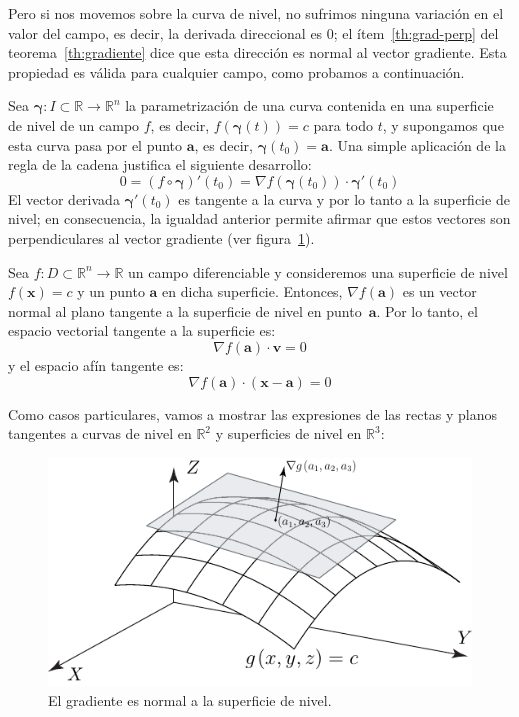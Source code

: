 Pero si nos movemos sobre la curva de nivel, no sufrimos ninguna variación en el valor del campo, es decir, la derivada direccional es 0;
el ítem~\ref{th:grad-perp} del teorema~\ref{th:gradiente}
dice que esta dirección es normal al vector gradiente.
Esta propiedad es válida para cualquier campo, como probamos a continuación.

Sea $\boldsymbol\gamma\colon I\subset\mathbb{R}\to\mathbb{R}^n$ la parametrización de una curva contenida en una superficie de nivel de un campo $f$, es decir, $f(\boldsymbol\gamma(t))=c$ para todo $t$, y supongamos que esta curva pasa por el punto $\boldsymbol a$, es decir, $\boldsymbol\gamma(t_0)=\boldsymbol a$.
Una simple aplicación de la regla de la cadena justifica el siguiente desarrollo:
\[
0=(f\circ \boldsymbol\gamma)'(t_0)=
\nabla f(\boldsymbol\gamma(t_0))\cdot\boldsymbol\gamma'(t_0)
\]
El vector derivada $\boldsymbol\gamma'(t_0)$ es tangente a la curva y por lo tanto a la superficie de nivel; en consecuencia, la igualdad anterior permite afirmar que estos vectores son perpendiculares al vector gradiente (ver figura~\ref{fig:sup-niv}).
%
\begin{teorema}\label{teo:tang-nivel}
Sea $f\colon \mathit{D}\subset\mathbb{R}^n\to \mathbb{R}$ un campo diferenciable y consideremos una superficie de nivel $f(\boldsymbol x)=c$ y un punto $\boldsymbol a$ en dicha superficie.
Entonces, $\nabla f(\boldsymbol a)$ es un vector normal al plano tangente a la superficie de nivel en punto~$\boldsymbol a$.
Por lo tanto, el espacio vectorial tangente a la superficie es:
\[
\nabla f(\boldsymbol a)\cdot\boldsymbol v =0
\]
y el espacio afín tangente es:
\[
\nabla f(\boldsymbol a)\cdot(\boldsymbol x -\boldsymbol a)=0
\]
\end{teorema}
%
Como casos particulares, vamos a mostrar las expresiones de las rectas y planos tangentes a curvas de nivel en $\mathbb{R}^2$ y superficies de nivel en $\mathbb{R}^3$:
%
\begin{figure}
\begin{center}
\includegraphics{T2/figs/grad-sup-nivel.pdf}
\end{center}
\caption{El gradiente es normal a la superficie de nivel.}
\label{fig:sup-niv}
\end{figure}
